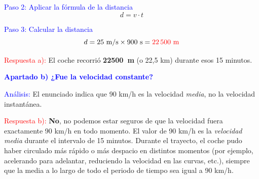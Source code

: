 \begin{exercise}
\begin{solu}
        \textcolor{blue}{Paso 2: Aplicar la fórmula de la distancia}
        \[
            \boxed{d = v \cdot t}
        \]

        \textcolor{blue}{Paso 3: Calcular la distancia}
        \[
            d = 25 \text{ m/s} \times 900 \text{ s} = \textcolor{red}{22\,500 \text{ m}}
        \]

        \textcolor{red}{Respuesta a):} El coche recorrió \textbf{\qty{22500}{\m}} (o 22,5 km) durante esos 15 minutos.

        \vspace{0.5cm}

        \textbf{\textcolor{blue}{Apartado b) ¿Fue la velocidad constante?}}

        \textcolor{blue}{Análisis:} El enunciado indica que 90 km/h es la velocidad \textit{media}, no la velocidad instantánea.

        \textcolor{red}{Respuesta b):} \textbf{No}, no podemos estar seguros de que la velocidad fuera exactamente 90 km/h en todo momento. El valor de 90 km/h es la \textit{velocidad media} durante el intervalo de 15 minutos. Durante el trayecto, el coche pudo haber circulado más rápido o más despacio en distintos momentos (por ejemplo, acelerando para adelantar, reduciendo la velocidad en las curvas, etc.), siempre que la media a lo largo de todo el periodo de tiempo sea igual a 90 km/h.
    \end{solu}
\end{exercise}


